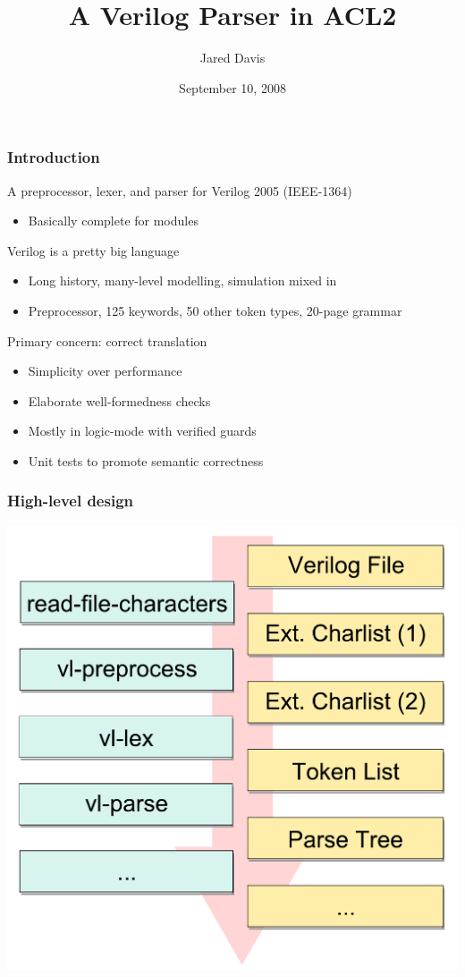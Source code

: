 \documentclass{beamer}
\title{A Verilog Parser in ACL2}
\author[Page \thepage]{Jared Davis}
\institute{Centaur Technology}
\date{September 10, 2008}
\newcommand{\Highlight}[1]{{\color{Highlight}#1}}
\newcommand{\SmallSkip}{\vspace{0.5cm}\noindent}
\begin{document}
\maketitle
\logo{}


\section[Introduction]{}
\begin{frame}
\frametitle{Introduction}
A preprocessor, lexer, and parser for Verilog 2005 (IEEE-1364)
\begin{itemize}
\item Basically complete for modules
\end{itemize}
\SmallSkip
Verilog is a pretty big language
\begin{itemize}
\item Long history, many-level modelling, simulation mixed in
\item Preprocessor, 125 keywords, 50 other token types, 20-page grammar
\end{itemize}
\SmallSkip
Primary concern: \Highlight{correct translation}
\begin{itemize}
\item Simplicity over performance
\item Elaborate well-formedness checks
\item Mostly in logic-mode with verified guards
\item Unit tests to promote semantic correctness
\end{itemize}
\end{frame}

\begin{frame}
\frametitle{High-level design}
\begin{center}
\includegraphics[scale=0.35]{vl-parser}
\end{center}
\end{frame}
\end{document}
